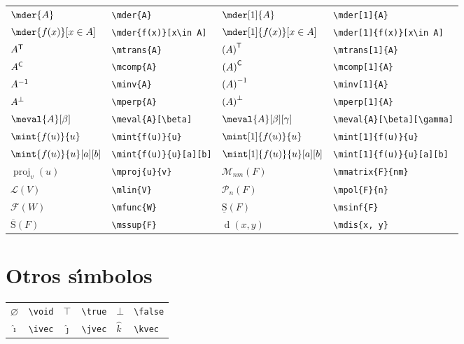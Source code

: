 \documentclass[10pt, a4paper]{article}
\newcommand{\ds}{\displaystyle}
\newcommand{\mtrans}[2][0]{
	\ifthenelse{ \equal{#1}{0} }{{#2}^{\mathsf{T}}}{\left( #2 \right)^{\mathsf{T}}}
}
\newcommand{\mcomp}[2][0]{
	\ifthenelse{ \equal{#1}{0} }{{#2}^{\mathsf{C}}}{\left( #2 \right)^{\mathsf{C}}}
}
\newcommand{\minv}[2][0]{
	\ifthenelse{ \equal{#1}{0} }{{#2}^{-1}}{\left( #2 \right)^{-1}}
}
\newcommand{\mperp}[2][0]{
	\ifthenelse{ \equal{#1}{0} }{{#2}^{\perp}}{\left( #2 \right)^{\perp}}
}
\newcommand{\mproj}[2]{\operatorname{proj}_{#2}\left(#1\right)}
\newcommand{\mpol}[2]{\mathcal{P}_{#2}\left( #1 \right)}
\newcommand{\mmatrix}[2]{\mathcal{M}_{#2}\left( #1 \right)}
\newcommand{\mlin}[1]{\mathcal{L}\left( #1 \right)}
\newcommand{\mfunc}[1]{\mathcal{F}\left( #1 \right)}
\newcommand{\mdis}[1]{\operatorname{d}\left( #1 \right)}
\newcommand{\msinf}[1]{\operatorname{\underline{S}}\left( #1 \right)}
\newcommand{\mssup}[1]{\operatorname{\overline{S}}\left( #1 \right)}
\newcommand{\void}{\varnothing}
\newcommand{\true}{\top}
\newcommand{\false}{\bot}
\newcommand{\ivec}{\hat{\imath}}
\newcommand{\jvec}{\hat{\jmath}}
\newcommand{\kvec}{\hat{k}}
\begin{document}
\begin{center}
\begin{tabular}{ll|ll}
		$ \mder{A} $ & \texttt{\textbackslash mder\{A\}} & $ \mder[1]{A} $ & \texttt{\textbackslash mder[1]\{A\}}\\
		$ \ds\mder{f(x)}[x\in A] $ & \texttt{\textbackslash mder\{f(x)\}[x\textbackslash in A]} & $ \ds\mder[1]{f(x)}[x\in A] $ & \texttt{\textbackslash mder[1]\{f(x)\}[x\textbackslash in A]}\\
		$ \mtrans{A} $ & \texttt{\textbackslash mtrans\{A\}} & $ \mtrans[1]{A} $ & \texttt{\textbackslash mtrans[1]\{A\}}\\
		$ \mcomp{A} $ & \texttt{\textbackslash mcomp\{A\}} & $ \mcomp[1]{A} $ & \texttt{\textbackslash mcomp[1]\{A\}}\\
		$ \minv{A} $ & \texttt{\textbackslash minv\{A\}} & $ \minv[1]{A} $ & \texttt{\textbackslash minv[1]\{A\}}\\
		$ \mperp{A} $ & \texttt{\textbackslash mperp\{A\}} & $ \mperp[1]{A} $ & \texttt{\textbackslash mperp[1]\{A\}}\\
		$ \meval{A}[\beta] $ & \texttt{\textbackslash meval\{A\}[\textbackslash beta]} & $ \meval{A}[\beta][\gamma] $ & \texttt{\textbackslash meval\{A\}[\textbackslash beta][\textbackslash gamma]}\\
		$ \ds\mint{f(u)}{u} $ & \texttt{\textbackslash mint\{f(u)\}\{u\}} & $ \ds\mint[1]{f(u)}{u} $ & \texttt{\textbackslash mint[1]\{f(u)\}\{u\}}\\
		$ \ds\mint{f(u)}{u}[a][b] $ & \texttt{\textbackslash mint\{f(u)\}\{u\}[a][b]} & $ \ds\mint[1]{f(u)}{u}[a][b] $ & \texttt{\textbackslash mint[1]\{f(u)\}\{u\}[a][b]}\\
		$ \mproj{u}{v} $ & \texttt{\textbackslash mproj\{u\}\{v\}} & $ \mmatrix{F}{nm} $ & \texttt{\textbackslash mmatrix\{F\}\{nm\}}\\
		$ \mlin{V} $ & \texttt{\textbackslash mlin\{V\}} & $ \mpol{F}{n} $ & \texttt{\textbackslash mpol\{F\}\{n\}}\\
		$ \mfunc{W} $ & \texttt{\textbackslash mfunc\{W\}} & $ \msinf{F} $ & \texttt{\textbackslash msinf\{F\}}\\
		$ \mssup{F} $ & \texttt{\textbackslash mssup\{F\}} & $ \mdis{x, y} $ & \texttt{\textbackslash mdis\{x, y\}} 
	\end{tabular}
\end{center}
\section{Otros s\'{\i}mbolos}
\begin{center}
	\begin{tabular}{ll|ll|ll}
		$ \void $ & \texttt{\textbackslash void} & $ \true $ & \texttt{\textbackslash true} & $ \false $ & \texttt{\textbackslash false}\\
		$ \ivec $ & \texttt{\textbackslash ivec} & $ \jvec $ & \texttt{\textbackslash jvec} & $ \kvec $ & \texttt{\textbackslash kvec}
	\end{tabular}
\end{center}
\end{document}
